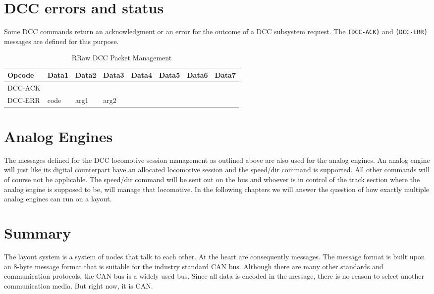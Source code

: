 \section{DCC errors and status}

Some DCC commands return an acknowledgment or an error for the outcome of a DCC subsystem request. The \texttt{(DCC-ACK)} and \texttt{(DCC-ERR)} messages are defined for this purpose.

\begin{table}[ht!]
    \begin{center}
        \caption{RRaw DCC Packet Management}
        \begin{tabular}{|l|l|l|l|l|l|l|l|}
            \toprule
            \textbf{Opcode}  & \textbf{Data1} & \textbf{Data2} & \textbf{Data3} & \textbf{Data4} & \textbf{Data5} & \textbf{Data6} & \textbf{Data7} \\
            \midrule
            DCC-ACK & & & & & & & \\
            DCC-ERR & code & arg1 & arg2 & & & & \\
            \bottomrule
        \end{tabular}
    \end{center}
\end{table}

\section{Analog Engines}

The messages defined for the DCC locomotive session management as outlined above are also used for the analog engines. An analog engine will just like its digital counterpart have an allocated locomotive session and the speed/dir command is supported. All other commands will of course not be applicable. The speed/dir command will be sent out on the bus and whoever is in control of the track section where the analog engine is supposed to be, will manage that locomotive. In the following chapters we will answer the question of how exactly multiple analog engines can run on a layout.

\section{Summary}

The layout system is a system of nodes that talk to each other. At the heart are consequently messages. The message format is built upon an 8-byte message format that is suitable for the industry standard CAN bus. Although there are many other standards and communication protocols, the CAN bus is a widely used bus. Since all data is encoded in the message, there is no reason to select another communication media. But right now, it is CAN.


